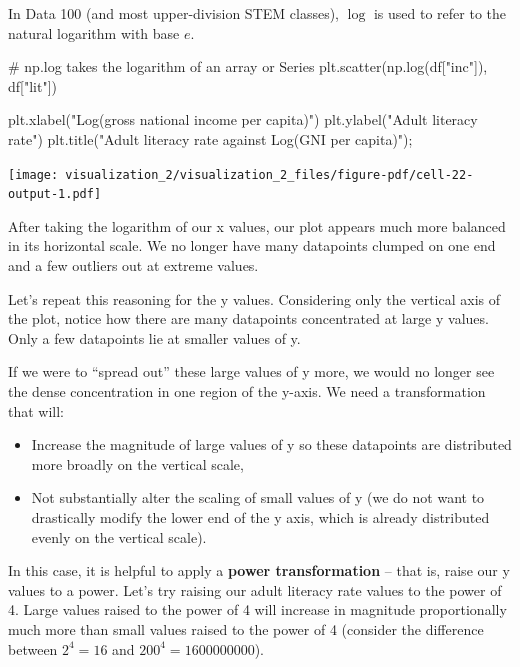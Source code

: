 \documentclass[
  letterpaper,
  DIV=11,
  numbers=noendperiod]{scrreprt}
\newenvironment{Shaded}{\begin{snugshade}}{\end{snugshade}}
\newcommand{\CommentTok}[1]{\textcolor[rgb]{0.37,0.37,0.37}{#1}}
\newcommand{\NormalTok}[1]{\textcolor[rgb]{0.00,0.23,0.31}{#1}}
\newcommand{\OperatorTok}[1]{\textcolor[rgb]{0.37,0.37,0.37}{#1}}
\newcommand{\StringTok}[1]{\textcolor[rgb]{0.13,0.47,0.30}{#1}}
\providecommand{\tightlist}{%
  \setlength{\itemsep}{0pt}\setlength{\parskip}{0pt}}\usepackage{longtable,booktabs,array}
\begin{document}
In Data 100 (and most upper-division STEM classes), \(\log\) is used to
refer to the natural logarithm with base \(e\).

\begin{Shaded}
\begin{Highlighting}[]
\CommentTok{\# np.log takes the logarithm of an array or Series}
\NormalTok{plt.scatter(np.log(df[}\StringTok{"inc"}\NormalTok{]), df[}\StringTok{"lit"}\NormalTok{])}

\NormalTok{plt.xlabel(}\StringTok{"Log(gross national income per capita)"}\NormalTok{)}
\NormalTok{plt.ylabel(}\StringTok{"Adult literacy rate"}\NormalTok{)}
\NormalTok{plt.title(}\StringTok{"Adult literacy rate against Log(GNI per capita)"}\NormalTok{)}\OperatorTok{;}
\end{Highlighting}
\end{Shaded}

\texttt{[image: visualization\_2/visualization\_2\_files/figure-pdf/cell-22-output-1.pdf]}

After taking the logarithm of our x values, our plot appears much more
balanced in its horizontal scale. We no longer have many datapoints
clumped on one end and a few outliers out at extreme values.

Let's repeat this reasoning for the y values. Considering only the
vertical axis of the plot, notice how there are many datapoints
concentrated at large y values. Only a few datapoints lie at smaller
values of y.

If we were to ``spread out'' these large values of y more, we would no
longer see the dense concentration in one region of the y-axis. We need
a transformation that will:

\begin{itemize}
\tightlist
\item
  Increase the magnitude of large values of y so these datapoints are
  distributed more broadly on the vertical scale,
\item
  Not substantially alter the scaling of small values of y (we do not
  want to drastically modify the lower end of the y axis, which is
  already distributed evenly on the vertical scale).
\end{itemize}

In this case, it is helpful to apply a \textbf{power transformation} --
that is, raise our y values to a power. Let's try raising our adult
literacy rate values to the power of 4. Large values raised to the power
of 4 will increase in magnitude proportionally much more than small
values raised to the power of 4 (consider the difference between
\(2^4 = 16\) and \(200^4 = 1600000000\)).
\end{document}
